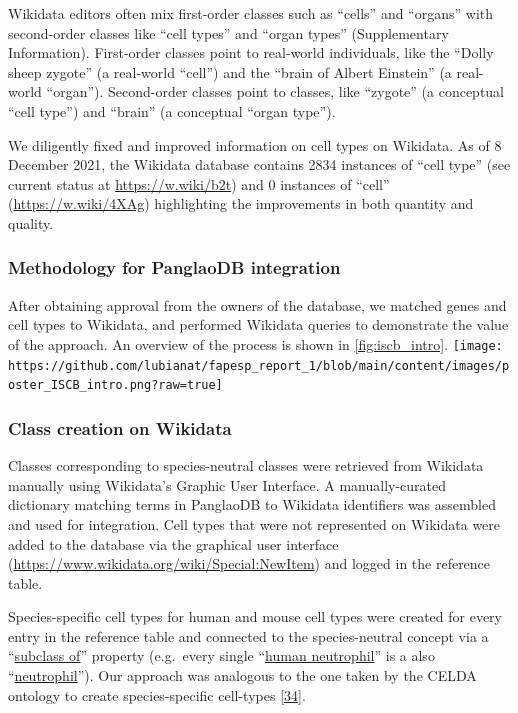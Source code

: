 Wikidata editors often mix first-order classes such as ``cells'' and ``organs'' with second-order classes like ``cell types'' and ``organ types'' (Supplementary Information). First-order classes point to real-world individuals, like the ``Dolly sheep zygote'' (a real-world ``cell'') and the ``brain of Albert Einstein'' (a real-world ``organ''). Second-order classes point to classes, like ``zygote'' (a conceptual ``cell type'') and ``brain'' (a conceptual ``organ type'').

We diligently fixed and improved information on cell types on Wikidata.
As of 8 December 2021, the Wikidata database contains 2834 instances of ``cell type'' (see current status at \url{https://w.wiki/b2t}) and 0 instances of ``cell'' (\url{https://w.wiki/4XAg}) highlighting the improvements in both quantity and quality.

\hypertarget{methodology-for-panglaodb-integration}{%
\subsubsection{Methodology for PanglaoDB integration}\label{methodology-for-panglaodb-integration}}

After obtaining approval from the owners of the database, we matched genes and cell types to Wikidata, and performed Wikidata queries to demonstrate the value of the approach. An overview of the process is shown in \ref{fig:iscb_intro}.
\texttt{[image: https://github.com/lubianat/fapesp\_report\_1/blob/main/content/images/poster\_ISCB\_intro.png?raw=true]}

\hypertarget{class-creation-on-wikidata}{%
\subsubsection{Class creation on Wikidata}\label{class-creation-on-wikidata}}

Classes corresponding to species-neutral classes were retrieved from Wikidata manually using Wikidata's Graphic User Interface.
A manually-curated dictionary matching terms in PanglaoDB to Wikidata identifiers was assembled and used for integration.
Cell types that were not represented on Wikidata were added to the database via the graphical user interface (\url{https://www.wikidata.org/wiki/Special:NewItem}) and logged in the reference table.

Species-specific cell types for human and mouse cell types were created for every entry in the reference table and connected to the species-neutral concept via a ``\href{http://www.wikidata.org/entity/P279}{subclass of}'' property (e.g.~every single ``\href{http://www.wikidata.org/entity/Q101405102}{human neutrophil}'' is a also ``\href{http://www.wikidata.org/entity/Q188417}{neutrophil}'').
Our approach was analogous to the one taken by the CELDA ontology to create species-specific cell-types {[}\protect\hyperlink{ref-RLHsA1U8}{34}{]}.

